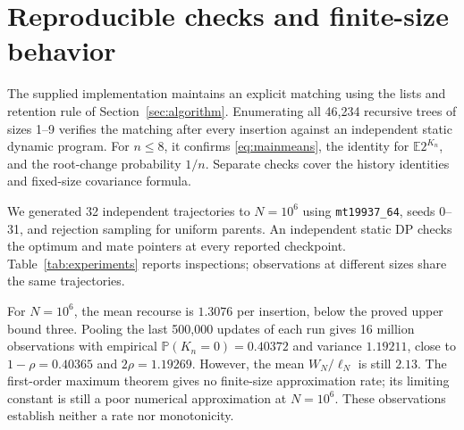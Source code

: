\documentclass[runningheads,envcountsame,orivec]{llncs}
\newcommand{\E}{\mathbb E}
\newcommand{\PP}{\mathbb P}
\begin{document}
\section{Reproducible checks and finite-size behavior}\label{sec:experiments}

The supplied implementation maintains an explicit matching using the
lists and retention rule of Section~\ref{sec:algorithm}. Enumerating
all 46,234 recursive trees of sizes 1--9 verifies the matching after
every insertion against an independent static dynamic program. For
$n\le8$, it confirms \eqref{eq:mainmeans}, the identity for
$\E2^{K_n}$, and the root-change probability $1/n$. Separate checks
cover the history identities and fixed-size covariance formula.

We generated 32 independent trajectories to $N=10^6$ using
\texttt{mt19937\_64}, seeds 0--31, and rejection sampling for uniform
parents. An independent static DP checks the optimum and mate pointers
at every reported checkpoint. Table~\ref{tab:experiments} reports
inspections; observations at different sizes share the same trajectories.


For $N=10^6$, the mean recourse is $1.3076$ per insertion, below the
proved upper bound three. Pooling the last 500,000 updates of each run
gives 16 million observations with empirical $\PP(K_n=0)=0.40372$
and variance $1.19211$, close to $1-\rho=0.40365$ and
$2\rho=1.19269$. However, the mean $W_N/\ell_N$ is still $2.13$.
The first-order maximum theorem gives no finite-size approximation
rate; its limiting constant is still a poor numerical approximation at
$N=10^6$. These observations establish neither a rate nor monotonicity.
\end{document}
